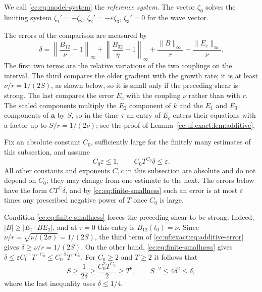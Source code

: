 We call \eqref{cc:eq:model-system} the \emph{reference system}. The
vector $\zeta_0$ solves the limiting system $\zeta_1'=-\zeta_2$,
$\zeta_2'=-\varepsilon\zeta_3$, $\zeta_3'=0$ for the wave vector.

The errors of the comparison are measured by
\begin{equation}\label{cc:uf:exact:eq:additive-error}
 \delta=\left\|\frac{B_{12}}{\nu}-1\right\|_\infty
       +\left\|\frac{B_{32}}{\eta}-1\right\|_\infty
       +\frac{\|B\|_\infty}{r}+\frac{\|E_c\|_\infty}{\nu}.
\end{equation}
The first two terms are the relative variations of the two couplings on
the interval. The third compares the older gradient with the growth
rate; it is at least $\nu/r=1/(2S)$, as shown below, so it is small
only if the preceding shear is strong. The last compares the error
$E_c$ with the coupling $\nu$ rather than with $r$. The scaled
components multiply the $E_2$ component of $k$ and the $E_1$ and $E_3$
components of $\mathbf a$ by $S$, so in the time $\tau$ an entry of
$E_c$ enters their equations with a factor up to $S/r=1/(2\nu)$; see
the proof of Lemma~\ref{cc:uf:exact:lem:additive}.

Fix an absolute constant $C_0$, sufficiently large for the finitely
many estimates of this subsection, and assume
\begin{equation}\label{cc:eq:finite-smallness}
 C_0\varepsilon\le1,\qquad C_0T^{C_0}\delta\le\varepsilon .
\end{equation}
All other constants and exponents $C,c$ in this subsection are
absolute and do not depend on $C_0$; they may change from one estimate
to the next. The errors below have the form $CT^C\delta$, and by
\eqref{cc:eq:finite-smallness} such an error is at most $\varepsilon$
times any prescribed negative power of $T$ once $C_0$ is large.

Condition \eqref{cc:eq:finite-smallness} forces the preceding shear to
be strong. Indeed, $|B|\ge|E_1\cdot BE_2|$, and at $\tau=0$ this entry
is $B_{12}(t_0)=\nu$. Since $\nu/r=\sqrt{\nu/(2\sigma)}=1/(2S)$, the
third term of \eqref{cc:uf:exact:eq:additive-error} gives
$\delta\ge\nu/r=1/(2S)$. On the other hand,
\eqref{cc:eq:finite-smallness} gives
$\delta\le\varepsilon C_0^{-1}T^{-C_0}\le C_0^{-2}T^{-C_0}$. For
$C_0\ge2$ and $T\ge2$ it follows that
\begin{equation}\label{cc:eq:S-bounds}
 S\ge\frac1{2\delta}\ge\frac{C_0^2T^{C_0}}2\ge T^2,\qquad
 S^{-2}\le4\delta^2\le\delta,
\end{equation}
where the last inequality uses $\delta\le1/4$.

